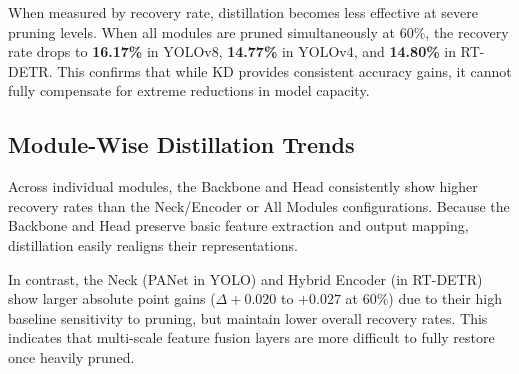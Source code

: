 When measured by recovery rate, distillation becomes less effective at severe pruning levels. When all modules are pruned simultaneously at 60\%, the recovery rate drops to \textbf{16.17\%} in YOLOv8, \textbf{14.77\%} in YOLOv4, and \textbf{14.80\%} in RT-DETR. This confirms that while KD provides consistent accuracy gains, it cannot fully compensate for extreme reductions in model capacity.

\subsection{Module-Wise Distillation Trends}
Across individual modules, the Backbone and Head consistently show higher recovery rates than the Neck/Encoder or All Modules configurations. Because the Backbone and Head preserve basic feature extraction and output mapping, distillation easily realigns their representations. 

In contrast, the Neck (PANet in YOLO) and Hybrid Encoder (in RT-DETR) show larger absolute point gains ($\Delta +0.020$ to $+0.027$ at 60\%) due to their high baseline sensitivity to pruning, but maintain lower overall recovery rates. This indicates that multi-scale feature fusion layers are more difficult to fully restore once heavily pruned.
